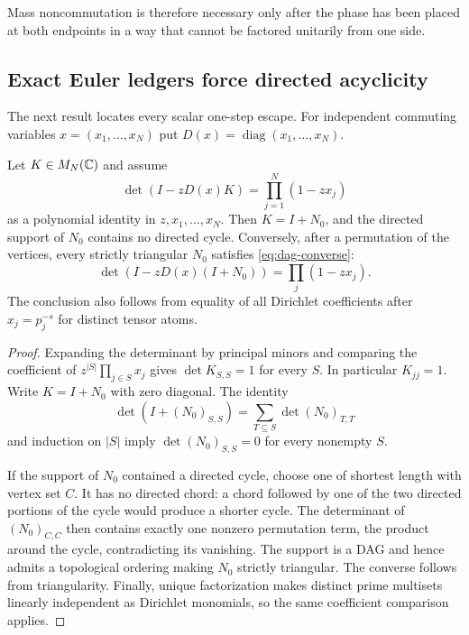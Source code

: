 Mass noncommutation is therefore necessary only after the phase has been
placed at both endpoints in a way that cannot be factored unitarily from one
side.

\subsection{Exact Euler ledgers force directed acyclicity}

The next result locates every scalar one-step escape.  For independent
commuting variables $x=(x_1,\ldots,x_N)$ put
$D(x)=\operatorname{diag}(x_1,\ldots,x_N)$.

\begin{theorem}
\label{thm:dag}
Let $K\in M_N(\mathbb C)$ and assume
\[
 \det(I-zD(x)K)=\prod_{j=1}^N(1-zx_j)             \tag{3.1}
\]
as a polynomial identity in $z,x_1,\ldots,x_N$.  Then $K=I+N_0$, and the
directed support of $N_0$ contains no directed cycle.  Conversely, after a
permutation of the vertices, every strictly triangular $N_0$ satisfies
\cref{eq:dag-converse}:
\begin{equation}
 \det(I-zD(x)(I+N_0))=\prod_j(1-zx_j).
 \label{eq:dag-converse}
\end{equation}
The conclusion also follows from equality of all Dirichlet coefficients
after $x_j=p_j^{-s}$ for distinct tensor atoms.
\end{theorem}

\begin{proof}
Expanding the determinant by principal minors and comparing the coefficient
of $z^{|S|}\prod_{j\in S}x_j$ gives $\det K_{S,S}=1$ for every $S$.
In particular $K_{jj}=1$.  Write $K=I+N_0$ with zero diagonal.  The identity
\[
 \det(I+(N_0)_{S,S})=
 \sum_{T\subseteq S}\det (N_0)_{T,T}
\]
and induction on $|S|$ imply $\det(N_0)_{S,S}=0$ for every nonempty $S$.

If the support of $N_0$ contained a directed cycle, choose one of shortest
length with vertex set $C$.  It has no directed chord: a chord followed by
one of the two directed portions of the cycle would produce a shorter cycle.
The determinant of $(N_0)_{C,C}$ then contains exactly one nonzero
permutation term, the product around the cycle, contradicting its vanishing.
The support is a DAG and hence admits a topological ordering making $N_0$
strictly triangular.  The converse follows from triangularity.  Finally,
unique factorization makes distinct prime multisets linearly independent as
Dirichlet monomials, so the same coefficient comparison applies.
\end{proof}

